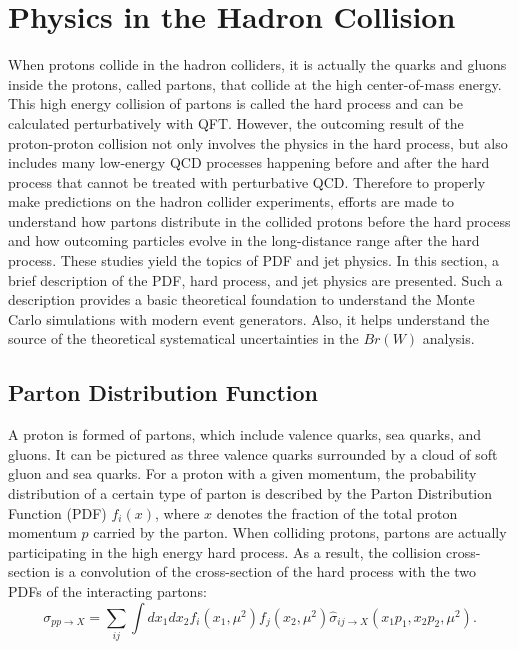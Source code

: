 

\section{Physics in the Hadron Collision}
\label{sec:relatedWorks:ppCollision} 

When protons collide in the hadron colliders, it is actually the quarks and gluons inside the protons, called partons, that collide at the high center-of-mass energy. This high energy collision of partons is called the hard process and can be calculated perturbatively with QFT. However, the outcoming result of the proton-proton collision not only involves the physics in the hard process, but also includes many low-energy QCD processes happening before and after the hard process that cannot be treated with perturbative QCD. Therefore to properly make predictions on the hadron collider experiments, efforts are made to understand how partons distribute in the collided protons before the hard process and how outcoming particles evolve in the long-distance range after the hard process. These studies yield the topics of PDF and jet physics. In this section, a brief description of the PDF, hard process, and jet physics are presented. Such a description provides a basic theoretical foundation to understand the Monte Carlo simulations with modern event generators. Also, it helps understand the source of the theoretical systematical uncertainties in the $Br(W)$ analysis.

\subsection{Parton Distribution Function}
\label{sec:relatedWorks:ppCollision:pdf} 


A proton is formed of partons, which include valence quarks, sea quarks, and gluons. It can be pictured as three valence quarks surrounded by a cloud of soft gluon and sea quarks. For a proton with a given momentum, the probability distribution of a certain type of parton is described by the Parton Distribution Function (PDF) $f_i(x)$, where $x$ denotes the fraction of the total proton momentum $p$ carried by the parton. When colliding protons, partons are actually participating in the high energy hard process. As a result, the collision cross-section is a convolution of the cross-section of the hard process with the two PDFs of the interacting partons:
\begin{equation}
    \sigma_{pp\to X } = \sum_{ij}\int dx_1 dx_2 f_i(x_1, \mu^2) f_j(x_2, \mu^2) \hat{\sigma}_{ij\to X } (x_1 p_1, x_2 p_2,\mu^2) .
    \label{eqn:relatedWorks:qft:ppCollision:factorization}
\end{equation}

